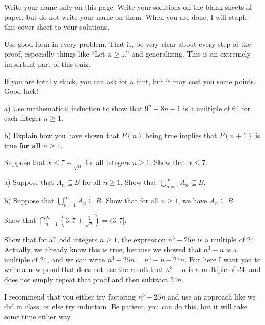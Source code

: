 \yourname


\noindent
Write your name only on this page.
Write your solutions on the blank sheets of paper, but do not write your name on them.
When you are done, I will staple this cover sheet to your solutions.

\noindent
Use good form in every problem.
That is, be very clear about every step of the proof, especially things like ``Let $n \geq 1$.'' and generalizing.
This is an extremely important part of this quiz.

\noindent
If you are totally stuck, you can ask for a hint, but it may cost you some points.
Good luck!

\vspace{0.2in}

\blist{0.9in}
\item a) Use mathematical induction to show that $9^n - 8n -1$ is a multiple of 64 for each integer $n \geq 1$.

b) Explain how you have shown that $P(n)$ being true implies that $P(n+1)$ is true {\bf for all $n \geq 1$}.

\item Suppose that $x \leq 7 + \frac{1}{\sqrt{n}}$ for all integers $n \geq 1$.
Show that $x \leq 7$.

\item a) Suppose that $A_n \subseteq B$ for all $n \geq 1$.  Show that $\displaystyle \bigcup_{n=1}^{\infty} A_n \subseteq B$.

b) Suppose that $\displaystyle \bigcup_{n=1}^{\infty} A_n \subseteq B$.
Show that for all $n \geq 1$, we have $A_n \subseteq B$.

\item Show that $\displaystyle \bigcap_{n=1}^{\infty} (3,7+\frac{1}{\sqrt{n}}) = (3,7]$.

\item Show that for all odd integers $n \geq 1$, the expression $n^3 - 25n$ is a multiple of 24.
Actually, we already know this is true, because we showed that $n^3-n$ is a multiple of 24, and we can write $n^3-25n = n^3-n-24n$.  But here I want you to write a new proof that does not use the result that $n^3-n$ is a multiple of 24, and does not simply repeat that proof and then subtract $24n$.

I recommend that you either try factoring $n^3-25n$ and use an approach like we did in class, or else try induction.
Be patient, you can do this, but it will take some time either way.

\elist
